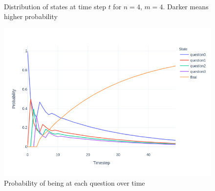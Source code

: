 \documentclass[12pt]{article}
\theoremstyle{definition}
\begin{document}
\begin{figure}[h]
    \begin{center}
        \begin{minipage}{.24\textwidth}
            
        \end{minipage}
        \begin{minipage}{.24\textwidth}
            
        \end{minipage}
        \begin{minipage}{.24\textwidth}
            
        \end{minipage}
        \begin{minipage}{.24\textwidth}
            
        \end{minipage}
        \begin{minipage}{.24\textwidth}
            
        \end{minipage}
        \begin{minipage}{.24\textwidth}
            
        \end{minipage}
        \begin{minipage}{.24\textwidth}
            
        \end{minipage}
        \begin{minipage}{.24\textwidth}
            
        \end{minipage}
        \caption{Distribution of states at time step $t$ for $n=4$, $m=4$. Darker means higher probability}
        \label{fig:distmc}
    \end{center}
\end{figure}

\begin{figure}
    \begin{center}
        \includegraphics[scale=0.5]{imgs/dist_questions.png}
        \caption{Probability of being at each question over time}
        \label{fig:dist_questions}
    \end{center}
\end{figure}
\end{document}
